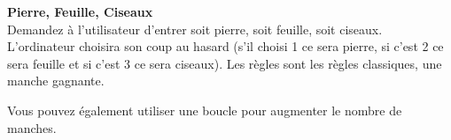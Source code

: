 \newpage
\begin{Exercice}[20 minutes] \textbf{Pierre, Feuille, Ciseaux \optionnel}\\
  Demandez à l'utilisateur d'entrer soit pierre, soit feuille, soit ciseaux. L'ordinateur choisira son coup au hasard (s'il choisi 1 ce sera pierre, si c'est 2 ce sera feuille et si c'est 3 ce sera ciseaux). Les règles sont les règles classiques, une manche gagnante.   \\
  
  
   
    \begin{solution}
    
    
    
    Vous pouvez également utiliser une boucle pour augmenter le nombre de manches. \\
           
    \end{solution}   
\end{Exercice}


